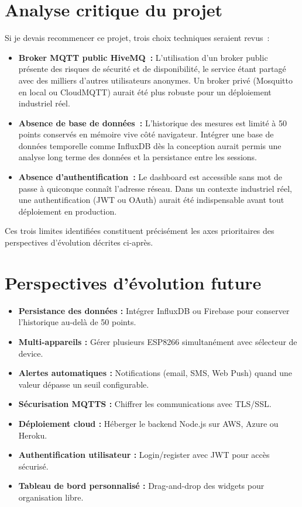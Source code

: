 \documentclass[12pt, a4paper]{report}
\begin{document}
\section{Analyse critique du projet}

Si je devais recommencer ce projet, trois choix techniques seraient
revus~:

\begin{itemize}[leftmargin=1.5cm, itemsep=6pt]
  \item \textbf{Broker MQTT public HiveMQ~:} L'utilisation d'un
        broker public pr\'esente des risques de s\'ecurit\'e et de
        disponibilit\'e, le service \'etant partag\'e avec des
        milliers d'autres utilisateurs anonymes. Un broker priv\'e
        (Mosquitto en local ou CloudMQTT) aurait \'et\'e plus robuste
        pour un d\'eploiement industriel r\'eel.
  \item \textbf{Absence de base de donn\'ees~:} L'historique des
        mesures est limit\'e \`a 50 points conserv\'es en m\'emoire
        vive c\^ot\'e navigateur. Int\'egrer une base de donn\'ees
        temporelle comme InfluxDB d\`es la conception aurait permis
        une analyse long terme des donn\'ees et la persistance entre
        les sessions.
  \item \textbf{Absence d'authentification~:} Le dashboard est
        accessible sans mot de passe \`a quiconque conna\^it
        l'adresse r\'eseau. Dans un contexte industriel r\'eel, une
        authentification (JWT ou OAuth) aurait \'et\'e indispensable
        avant tout d\'eploiement en production.
\end{itemize}

Ces trois limites identifi\'ees constituent pr\'ecis\'ement les axes
prioritaires des perspectives d'\'evolution d\'ecrites ci-apr\`es.

\section{Perspectives d'\'evolution future}

\begin{itemize}[leftmargin=1.5cm, itemsep=6pt]
  \item \textbf{Persistance des donn\'ees :} Int\'egrer InfluxDB ou
        Firebase pour conserver l'historique au-del\`a de 50 points.
  \item \textbf{Multi-appareils :} G\'erer plusieurs ESP8266
        simultan\'ement avec s\'electeur de device.
  \item \textbf{Alertes automatiques :} Notifications (email, SMS,
        Web Push) quand une valeur d\'epasse un seuil configurable.
  \item \textbf{S\'ecurisation MQTTS :} Chiffrer les communications
        avec TLS/SSL.
  \item \textbf{D\'eploiement cloud :} H\'eberger le backend Node.js
        sur AWS, Azure ou Heroku.
  \item \textbf{Authentification utilisateur :} Login/register avec
        JWT pour acc\`es s\'ecuris\'e.
  \item \textbf{Tableau de bord personnalis\'e :} Drag-and-drop des
        widgets pour organisation libre.
\end{itemize}
\end{document}
